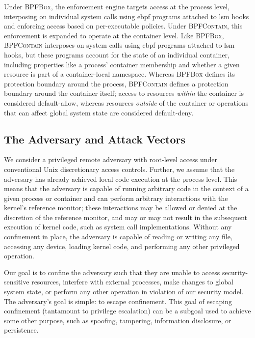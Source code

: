 \documentclass[
  fontsize=12pt,
  titlepage=firstiscover,
  paper=letter,
oneside,
  cleardoublepage=plain,
  parskip=half-,
  DIV=10,
  parindent,
  appendixprefix,
  chapterprefix,
  listof=totoc,
]{scrbook}
\newcommand{\bpfbox}{\textsc{BPFBox}}
\newcommand{\bpfcontain}{\textsc{BPFContain}}
\begin{document}
Under \bpfbox{}, the enforcement engine targets access at the process level, interposing
on individual system calls using \gls{ebpf} programs attached to \gls{lsm} hooks and
enforcing access based on per-executable policies. Under \bpfcontain{}, this enforcement
is expanded to operate at the container level. Like \bpfbox{}, \bpfcontain{} interposes on
system calls using \gls{ebpf} programs attached to \gls{lsm} hooks, but these programs
account for the state of an individual container, including properties like a process'
container membership and whether a given resource is part of a container-local namespace.
Whereas \bpfbox{} defines its protection boundary around the process, \bpfcontain{}
defines a protection boundary around the container itself; access to resources
\textit{within} the container is considered default-allow, whereas resources
\textit{outside}  of the container or operations that can affect global system state are
considered default-deny.







\subsection{The Adversary and Attack Vectors}

We consider a privileged remote adversary with root-level access under conventional Unix
discretionary access controls.  Further, we assume that the adversary has already achieved
local code execution at the process level. This means that the adversary is capable of
running arbitrary code in the context of a given process or container and can perform
arbitrary interactions with the kernel's reference monitor; these interactions may be
allowed or denied at the discretion of the reference monitor, and may or may not result in
the subsequent execution of kernel code, such as system call implementations. Without any
confinement in place, the adversary is capable of reading or writing any file, accessing
any device, loading kernel code, and performing any other privileged operation.

Our goal is to confine the adversary such that they are unable to access
security-sensitive resources, interfere with external processes, make changes to global
system state, or perform any other operation in violation of our security model.  The
adversary's goal is simple: to escape confinement. This goal of escaping confinement
(tantamount to privilege escalation) can be a subgoal used to achieve some other purpose,
such as spoofing, tampering, information disclosure, or persistence.
\end{document}
